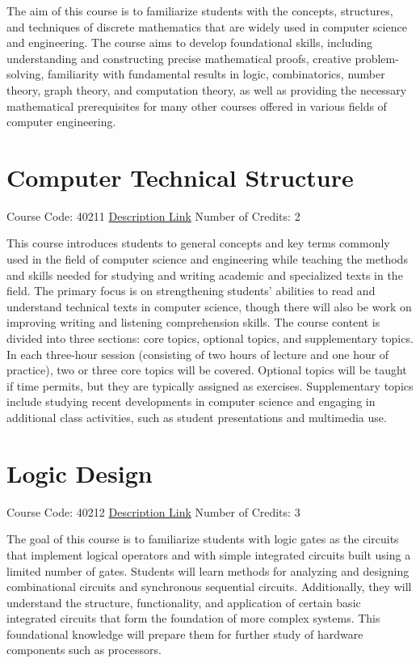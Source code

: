 The aim of this course is to familiarize students with the concepts, structures, and techniques of discrete mathematics that are widely used in computer science and engineering. The course aims to develop foundational skills, including understanding and constructing precise mathematical proofs, creative problem-solving, familiarity with fundamental results in logic, combinatorics, number theory, graph theory, and computation theory, as well as providing the necessary mathematical prerequisites for many other courses offered in various fields of computer engineering.

\section{Computer Technical Structure}
Course Code: 40211 \qquad \quad \href{https://docs.ce.sharif.edu/course/40211}{Description Link}
\qquad \quad Number of Credits: 2

This course introduces students to general concepts and key terms commonly used in the field of computer science and engineering while teaching the methods and skills needed for studying and writing academic and specialized texts in the field. The primary focus is on strengthening students' abilities to read and understand technical texts in computer science, though there will also be work on improving writing and listening comprehension skills. The course content is divided into three sections: core topics, optional topics, and supplementary topics. In each three-hour session (consisting of two hours of lecture and one hour of practice), two or three core topics will be covered. Optional topics will be taught if time permits, but they are typically assigned as exercises. Supplementary topics include studying recent developments in computer science and engaging in additional class activities, such as student presentations and multimedia use.

\section{Logic Design}
Course Code: 40212 \qquad \quad \href{https://docs.ce.sharif.edu/course/40212}{Description Link}
\qquad \quad Number of Credits: 3

The goal of this course is to familiarize students with logic gates as the circuits that implement logical operators and with simple integrated circuits built using a limited number of gates. Students will learn methods for analyzing and designing combinational circuits and synchronous sequential circuits. Additionally, they will understand the structure, functionality, and application of certain basic integrated circuits that form the foundation of more complex systems. This foundational knowledge will prepare them for further study of hardware components such as processors.


